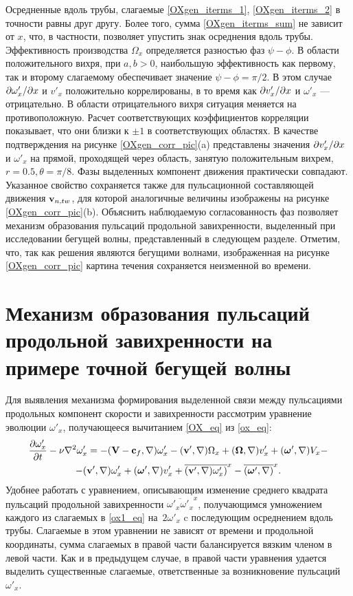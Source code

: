Осредненные вдоль трубы, слагаемые \eqref{OXgen_iterms_1}, \eqref{OXgen_iterms_2} в точности равны друг другу. Более того, сумма \eqref{OXgen_iterms_sum} не зависит от $x$, что, в частности, позволяет упустить знак осреднения вдоль трубы. Эффективность производства  $\Omega_x$ определяется разностью фаз $\psi - \phi$. В области положительного вихря, при $a,b > 0$, наибольшую эффективность как первому, так и второму слагаемому обеспечивает значение $\psi - \phi = \pi/2$. В этом случае $\partial \omega'_x/\partial x$ и $v'_x$ положительно коррелированы, в то время как $\partial v'_x/\partial x$ и $\omega'_x$ --- отрицательно. В области отрицательного вихря ситуация меняется на противоположную. Расчет соответствующих коэффициентов корреляции показывает, что они близки к $\pm1$ в соответствующих областях. В качестве подтверждения на рисунке \ref{OXgen_corr_pic}(a) представлены значения $\partial v'_x/\partial x$ и $\omega'_x$ на прямой, проходящей через область, занятую положительным вихрем, $r = 0.5, \theta = \pi/8$. Фазы выделенных компонент движения практически совпадают. Указанное свойство сохраняется также для пульсационной составляющей движения $\mathbf{v}_{n,tw}$, для которой аналогичные величины изображены на рисунке \ref{OXgen_corr_pic}(b). Объяснить наблюдаемую согласованность фаз позволяет механизм образования пульсаций продольной завихренности, выделенный при исследовании бегущей волны, представленный в следующем разделе. Отметим, что, так как решения являются бегущими волнами, изображенная на рисунке \ref{OXgen_corr_pic} картина течения сохраняется неизменной во времени. 


\section{Механизм образования пульсаций продольной завихренности на примере точной бегущей волны}

Для выявления механизма формирования выделенной связи между пульсациями продольных компонент скорости и завихренности рассмотрим уравнение эволюции $\omega'_x$, получающееся вычитанием \eqref{OX_eq} из \eqref{ox_eq}:
\begin{multline}\label{ox1_eq}
\frac{\partial \omega'_x}{\partial t} - \nu \nabla^2 \omega'_x = - (\mathbf{V} - \mathbf{c}_f, \nabla) \omega'_x - (\mathbf{v}', \nabla) \Omega_x
+(\mbox{\boldmath$\Omega$}, \nabla) v'_x + (\mbox{\boldmath$\omega$}', \nabla) V_x -\\- (\mathbf{v}', \nabla) \omega'_x  + (\mbox{\boldmath$\omega$}', \nabla) v'_x  + \overline{(\mathbf{v}', \nabla) \omega'_x)}^x  - \overline{(\mbox{\boldmath$\omega$}', \nabla)}^x.
\end{multline}
Удобнее работать с уравнением, описывающим изменение среднего квадрата пульсаций продольной завихренности $\overline{\omega'_x\omega'_x}^x$, получающимся умножением каждого из слагаемых в \eqref{ox1_eq} на~$2\omega'_x$ c последующим осреднением вдоль трубы. Слагаемые в этом уравнении не зависят от времени и продольной координаты, сумма слагаемых в правой части балансируется вязким членом в левой части. Как и в предыдущем случае, в правой части уравнения удается выделить существенные слагаемые, ответственные за возникновение пульсаций~$\omega'_x$.



